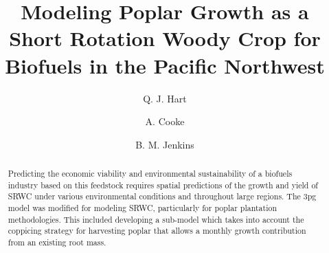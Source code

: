 \documentclass[preprint,12pt]{elsarticle}
\begin{document}
\begin{frontmatter}



\title{Modeling Poplar Growth as a Short Rotation Woody Crop for Biofuels in the Pacific Northwest}


\author[lawr]{Q. J. Hart}
\author[pfc]{A. Cooke}
\author[bioag]{B. M. Jenkins}

\address{Department of Land, Air, and Water, University of California, Davis, USA}
\address{Precision Forestry Cooperative, University of Washington, USA}
\address{Department of Biological and Agricultural Engineering, University of California, Davis, USA}

\begin{abstract}
  Predicting the economic viability and environmental sustainability
  of a biofuels industry based on this feedstock requires spatial
  predictions of the growth and yield of \acf{SRWC} under various
  environmental conditions and throughout large regions.  The \acf{3pg}
  model was modified for modeling SRWC, particularly for poplar
  plantation methodologies.  This included developing a sub-model
  which takes into account the coppicing strategy for harvesting
  poplar that allows a monthly growth contribution from an existing
  root mass.


\end{abstract}
\end{frontmatter}
\end{document}
